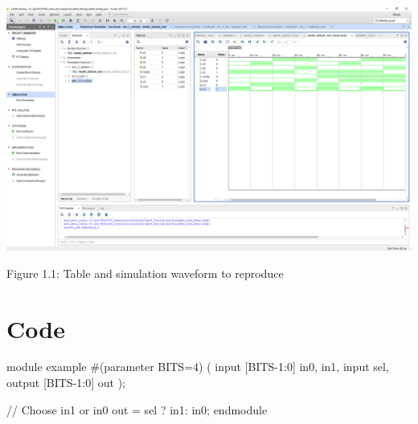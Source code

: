 \documentclass[11pt]{article}
\begin{document}
\begin{center}
	\includegraphics[width=1.0\textwidth, trim=19cm 15cm .5cm 4cm,clip]{lab1_example_screenshot.PNG}
\end{center}	
\begin{center}
Figure 1.1: Table and simulation waveform to reproduce 
\end{center}
	
	
\section*{Code}
module example
\#(parameter BITS=4)
(
input [BITS-1:0] in0, in1,
input sel,
output [BITS-1:0] out
);

// Choose in1 or in0
out = sel ? in1: in0; 
endmodule
\end{document}
